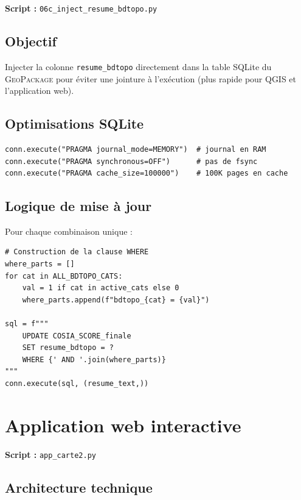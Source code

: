 \documentclass[12pt,a4paper]{report}
\newcommand{\code}[1]{\texttt{\small #1}}
\newcommand{\gpkg}{\textsc{GeoPackage}}
\begin{document}
\textbf{Script :} \code{06c\_inject\_resume\_bdtopo.py}

\subsection{Objectif}

Injecter la colonne \code{resume\_bdtopo} directement dans la table SQLite du \gpkg{} pour éviter une jointure à l'exécution (plus rapide pour QGIS et l'application web).

\subsection{Optimisations SQLite}

\begin{lstlisting}[language=Python3, caption={Pragmas SQLite pour writes rapides}]
conn.execute("PRAGMA journal_mode=MEMORY")  # journal en RAM
conn.execute("PRAGMA synchronous=OFF")      # pas de fsync
conn.execute("PRAGMA cache_size=100000")    # 100K pages en cache
\end{lstlisting}

\subsection{Logique de mise à jour}

Pour chaque combinaison unique :
\begin{lstlisting}[language=Python3, caption={UPDATE ciblé par combo BD TOPO}]
# Construction de la clause WHERE
where_parts = []
for cat in ALL_BDTOPO_CATS:
    val = 1 if cat in active_cats else 0
    where_parts.append(f"bdtopo_{cat} = {val}")

sql = f"""
    UPDATE COSIA_SCORE_finale
    SET resume_bdtopo = ?
    WHERE {' AND '.join(where_parts)}
"""
conn.execute(sql, (resume_text,))
\end{lstlisting}

\section{Application web interactive}

\textbf{Script :} \code{app\_carte2.py}

\subsection{Architecture technique}
\end{document}
